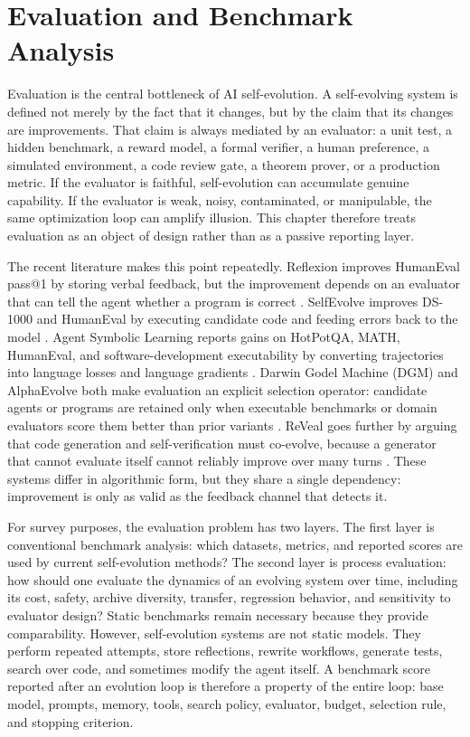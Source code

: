 \section{Evaluation and Benchmark Analysis}
\label{sec:evaluation-benchmark-analysis}

Evaluation is the central bottleneck of AI self-evolution. A self-evolving system is defined not merely by the fact that it changes, but by the claim that its changes are improvements. That claim is always mediated by an evaluator: a unit test, a hidden benchmark, a reward model, a formal verifier, a human preference, a simulated environment, a code review gate, a theorem prover, or a production metric. If the evaluator is faithful, self-evolution can accumulate genuine capability. If the evaluator is weak, noisy, contaminated, or manipulable, the same optimization loop can amplify illusion. This chapter therefore treats evaluation as an object of design rather than as a passive reporting layer.

The recent literature makes this point repeatedly. Reflexion improves HumanEval pass@1 by storing verbal feedback, but the improvement depends on an evaluator that can tell the agent whether a program is correct \cite{reflexion2023}. SelfEvolve improves DS-1000 and HumanEval by executing candidate code and feeding errors back to the model \cite{selfevolve2023}. Agent Symbolic Learning reports gains on HotPotQA, MATH, HumanEval, and software-development executability by converting trajectories into language losses and language gradients \cite{agentsymboliclearning2024}. Darwin Godel Machine (DGM) and AlphaEvolve both make evaluation an explicit selection operator: candidate agents or programs are retained only when executable benchmarks or domain evaluators score them better than prior variants \cite{darwingodelmachine2025,alphaevolve2025}. ReVeal goes further by arguing that code generation and self-verification must co-evolve, because a generator that cannot evaluate itself cannot reliably improve over many turns \cite{reveal2025}. These systems differ in algorithmic form, but they share a single dependency: improvement is only as valid as the feedback channel that detects it.

For survey purposes, the evaluation problem has two layers. The first layer is conventional benchmark analysis: which datasets, metrics, and reported scores are used by current self-evolution methods? The second layer is process evaluation: how should one evaluate the dynamics of an evolving system over time, including its cost, safety, archive diversity, transfer, regression behavior, and sensitivity to evaluator design? Static benchmarks remain necessary because they provide comparability. However, self-evolution systems are not static models. They perform repeated attempts, store reflections, rewrite workflows, generate tests, search over code, and sometimes modify the agent itself. A benchmark score reported after an evolution loop is therefore a property of the entire loop: base model, prompts, memory, tools, search policy, evaluator, budget, selection rule, and stopping criterion.

